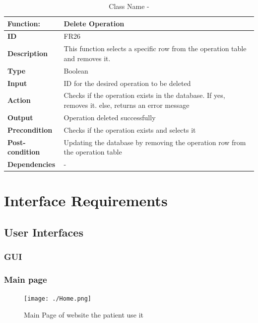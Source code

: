 \documentclass[]{article}
\begin{document}
\FloatBarrier
\begin{table}[h]
\caption{Class Name - }
\label{tab:my-table}
\begin{tabular}{|p{}|p{}|}
\hline
\textbf{Function:} & Delete Operation
\\ \hline
\textbf{ID}  &   FR26        

\\ \hline
\textbf{Description}    &  This function selects a specific row from the operation table and removes it.                                   
\\ \hline
\textbf{Type}    &   Boolean      

\\ \hline
\textbf{Input}        &  ID for the desired operation to be deleted 


\\ \hline
\textbf{Action}            & Checks if the operation exists in the database. If yes, removes it. else, returns an error message

\\ \hline
\textbf{Output}            & Operation deleted successfully 

\\ \hline
\textbf{Precondition}           & Checks if the operation exists and selects it

\\ \hline
\textbf{Post-condition}           & Updating the database by removing the operation row from the operation table


\\ \hline
\textbf{Dependencies}           & -
\\ \hline
\end{tabular}
\end{table}




\FloatBarrier
\section{Interface Requirements}
\bigskip
\subsection{User Interfaces}
\bigskip
\subsubsection {GUI}
 \bigskip
 \bigskip
\FloatBarrier
\subsubsection{Main page}
\vfill
\begin{figure}[h]
\centering
\texttt{[image: ./Home.png]}
\caption{Main Page of website the patient use it}
\label{label1}
\end{figure}
\vfill
\newpage
\FloatBarrier
\end{document}
